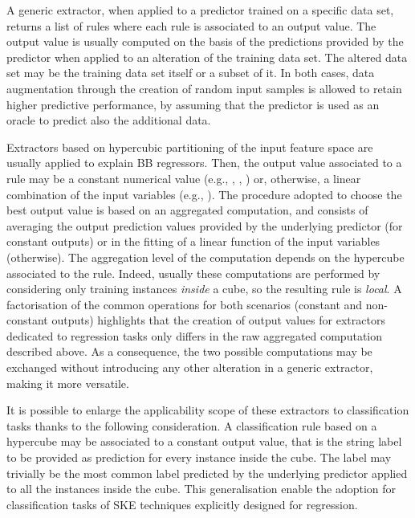 \documentclass[
]{ceurart}
\begin{document}
A generic extractor, when applied to a predictor trained on a specific data set, returns a list of rules where each rule is associated to an output value.
%
The output value is usually computed on the basis of the predictions provided by the predictor when applied to an alteration of the training data set.
%
The altered data set may be the training data set itself or a subset of it.
%
In both cases, data augmentation through the creation of random input samples is allowed to retain higher predictive performance, by assuming that the predictor is used as an oracle to predict also the additional data.

Extractors based on hypercubic partitioning of the input feature space are usually applied to explain BB regressors.
%
Then, the output value associated to a rule may be a constant numerical value (e.g., \iter{}, \gridex{}, \cart{}) or, otherwise, a linear combination of the input variables (e.g., \cart{}).
%
The procedure adopted to choose the best output value is based on an aggregated computation, and consists of averaging the output prediction values provided by the underlying predictor (for constant outputs) or in the fitting of a linear function of the input variables (otherwise).
%
The aggregation level of the computation depends on the hypercube associated to the rule.
%
Indeed, usually these computations are performed by considering only training instances \emph{inside} a cube, so the resulting rule is \emph{local}.
%
A factorisation of the common operations for both scenarios (constant and non-constant outputs) highlights that the creation of output values for extractors dedicated to regression tasks only differs in the raw aggregated computation described above.
%
As a consequence, the two possible computations may be exchanged without introducing any other alteration in a generic extractor, making it more versatile.

It is possible to enlarge the applicability scope of these extractors to classification tasks thanks to the following consideration.
%
A classification rule based on a hypercube may be associated to a constant output value, that is the string label to be provided as prediction for every instance inside the cube.
%
The label may trivially be the most common label predicted by the underlying predictor applied to all the instances inside the cube.
%
This generalisation enable the adoption for classification tasks of SKE techniques explicitly designed for regression.


\end{document}
